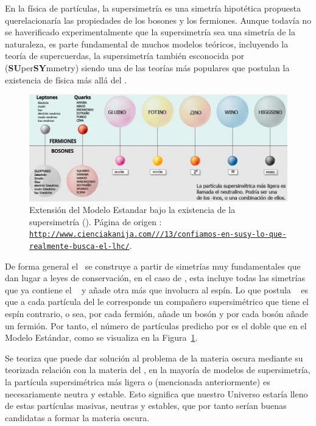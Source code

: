 En la física de partículas, la supersimetría es una simetría hipotética propuesta querelacionaría las propiedades de los bosones y los fermiones. Aunque todavía no se haverificado experimentalmente que la supersimetría sea una simetría de la naturaleza, es parte fundamental de muchos modelos teóricos, incluyendo la teoría de supercuerdas, la
supersimetría también esconocida por \SUSY (\textbf{SU}per\textbf{SY}mmetry) siendo una de las teorías más populares que postulan la existencia de física más allá del \ME. 
\begin{figure}[h!]
\centering
\includegraphics[width=1\textwidth]{Analisis_y_Resultados/imagenes/supersimetrias.png}
\caption{Extensión del Modelo Estandar bajo la existencia de la supersimetría (\SUSY). Página de origen : \href{http://www.cienciakanija.com/2009/11/13/confiamos-en-susy-lo-que-realmente-busca-el-lhc/}{\texttt{http://\-www.cienciakanija.com///13/\-con\-fia\-mos-\-en-\-susy-\-lo-\-que-\-real\-men\-te-bus\-ca-el-lhc/}}.}
\label{susy}
\end{figure}

De forma general el \ME ~se construye a partir de simetrías muy fundamentales que dan lugar a leyes de conservación, en el caso de \SUSY, esta incluye todas las simetrías que ya contiene el \ME~ y añade otra más que involucra al espín. Lo que postula \SUSY~ es que a cada partícula del \ME le corresponde un compañero supersimétrico que tiene el espín contrario, o sea, por cada fermión, \SUSY añade un bosón y por cada bosón añade un fermión. Por tanto, el número de partículas predicho por \SUSY es el doble que en el Modelo Estándar, como se visualiza en la Figura~\ref{susy}.

Se teoriza que \SUSY puede dar solución al problema de la materia oscura mediante su teorizada relación con la materia del \ME, en la mayoría de modelos de supersimetría, la partícula supersimétrica más ligera o \LSP (mencionada anteriormente) es necesariamente neutra y estable. Esto significa que nuestro Universo estaría lleno de estas partículas masivas, neutras y estables, que por tanto serían buenas candidatas a formar la materia oscura.

